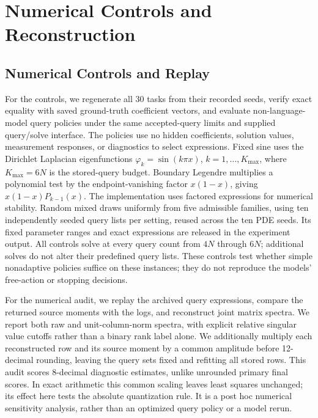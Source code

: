 \documentclass{article}
\begin{document}
\FloatBarrier
\section{Numerical Controls and Reconstruction}
\label{app:controls}
\subsection{Numerical Controls and Replay}
\label{sec:controls}

For the controls, we regenerate all 30 tasks from their recorded seeds, verify
exact equality with saved ground-truth coefficient vectors, and evaluate
non-language-model query policies under the same accepted-query limits and
supplied query/solve interface. The policies use no hidden coefficients, solution values, measurement responses,
or diagnostics to select expressions. Fixed sine uses the Dirichlet Laplacian eigenfunctions
\(\varphi_k=\sin(k\pi x)\), \(k=1,\ldots,K_{\max}\), where
\(K_{\max}=6N\) is the
stored-query budget. Boundary Legendre multiplies a polynomial test by the
endpoint-vanishing factor \(x(1-x)\), giving \(x(1-x)P_{k-1}(x)\).
The implementation uses factored expressions for numerical stability. Random mixed draws uniformly
from five admissible families, using ten independently seeded query lists per
setting, reused across the ten PDE seeds. Its fixed parameter ranges and exact
expressions are released in the experiment output. All controls solve at every
query count from \(4N\) through \(6N\); additional solves do not alter their
predefined query lists. These controls test whether simple nonadaptive policies suffice on these
instances; they do not reproduce the models' free-action
or stopping decisions.

For the numerical audit, we replay the archived query expressions, compare the
returned source moments with the logs, and reconstruct joint matrix spectra.
We report both raw and unit-column-norm spectra, with explicit relative singular
value cutoffs rather than a binary rank label alone. We additionally multiply
each reconstructed row and its source moment by a common amplitude before
12-decimal rounding, leaving the query sets fixed and refitting all stored rows. This audit scores
8-decimal diagnostic estimates, unlike unrounded primary final scores. In exact arithmetic this common scaling leaves least squares unchanged;
its effect here tests the absolute quantization rule. It is a post hoc numerical
sensitivity analysis, rather than an optimized query policy or a model rerun.
\end{document}
